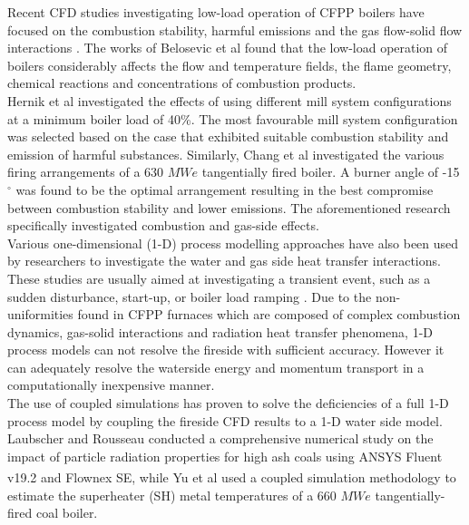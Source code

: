 \documentclass[twocolumn,10pt]{asme2ej}
\begin{document}
Recent CFD studies investigating low-load operation of CFPP boilers have focused on the combustion stability, harmful emissions and the gas flow-solid flow interactions \cite{Jiang2021}. The works of Belosevic et al \cite{Belosevic2019a} found that the low-load operation of boilers considerably affects the flow and temperature fields, the flame geometry, chemical reactions and concentrations of combustion products.\\

Hernik et al \cite{Hernik2020} investigated the effects of using different mill system configurations at a minimum boiler load of 40\%. The most favourable mill system configuration was selected based on the case that exhibited suitable combustion stability and emission of harmful substances. Similarly, Chang et al \cite{Chang2021} investigated the various firing arrangements of a 630 $MWe$ tangentially fired boiler. A burner angle of -15 $^\circ$ was found to be the optimal arrangement resulting in the best compromise between combustion stability and lower emissions. The aforementioned research specifically investigated combustion and gas-side effects.\\

Various one-dimensional (1-D) process modelling approaches have also been used by researchers to investigate the water and gas side heat transfer interactions. These studies are usually aimed at investigating a transient event, such as a sudden disturbance, start-up, or boiler load ramping \cite{Alobaid2017}. Due to the non-uniformities found in CFPP furnaces which are composed of complex combustion dynamics, gas-solid interactions and  radiation heat transfer phenomena, 1-D process models can not resolve the fireside with sufficient accuracy. However it can adequately resolve the waterside energy and momentum transport in a computationally inexpensive manner.\\
\newpage
The use of coupled simulations has proven to solve the deficiencies of a full 1-D process model by coupling the fireside CFD results to a 1-D water side model. Laubscher and Rousseau \cite{Laubscher2020} conducted a comprehensive numerical study on the impact of particle radiation properties for high ash coals using ANSYS Fluent v19.2\textsuperscript{\textregistered} and Flownex SE\textsuperscript{\textregistered}, while Yu et al \cite{Yu2019} used a coupled simulation methodology to estimate the superheater (SH) metal temperatures of a 660 $MWe$ tangentially-fired coal boiler.\\
\end{document}
